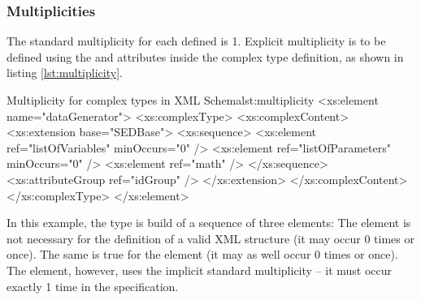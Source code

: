 \subsubsection{Multiplicities}
The standard multiplicity for each defined  is 1. Explicit multiplicity is to be defined using the  and  attributes inside the complex type definition, as shown in listing \ref{lst:multiplicity}.

\begin{myXmlLst}{Multiplicity for complex types in XML Schema}{lst:multiplicity}
<xs:element name="dataGenerator">
		<xs:complexType>
			<xs:complexContent>
				<xs:extension base="SEDBase">
					<xs:sequence>
						<xs:element ref="listOfVariables" minOccurs="0" />
						<xs:element ref="listOfParameters" minOccurs="0" />
						<xs:element ref="math" />
					</xs:sequence>
					<xs:attributeGroup ref="idGroup" />
				</xs:extension>
			</xs:complexContent>
		</xs:complexType>
	</xs:element>
\end{myXmlLst}
%
In this example, the  type is build of a sequence of three elements: The  element is not necessary for the definition of a valid  XML structure (it may occur 0 times or once). The same is true for the  element (it may as well occur 0 times or once). The  element, however, uses the implicit standard multiplicity -- it must occur exactly 1 time in the  specification.

